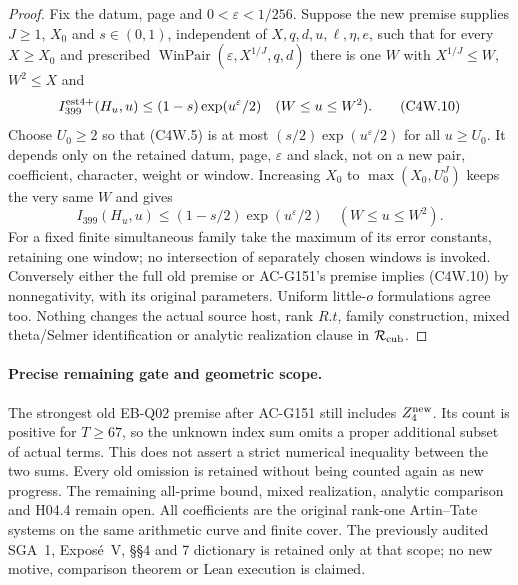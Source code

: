 \begin{proof}
Fix the datum, page and $0<\varepsilon<1/256$.
Suppose the new premise supplies $J\geq1$, $X_0$ and
$s\in(0,1)$, independent of $X,q,d,u,\ell,\eta,e$, such that
for every $X\geq X_0$ and prescribed
$\operatorname{WinPair}(\varepsilon,X^{1/J},q,d)$ there is one
$W$ with $X^{1/J}\leq W$, $W^2\leq X$ and
\[
 I_{399}^{\rm est4+}(H_u,u)\leq(1-s)\exp(u^\varepsilon/2)
                                  \quad(W\leq u\leq W^2).
 \tag{C4W.10}
\]
Choose $U_0\geq2$ so that (C4W.5) is at most
$(s/2)\exp(u^\varepsilon/2)$ for all $u\geq U_0$.
It depends only on the retained datum, page, $\varepsilon$ and
slack, not on a new pair, coefficient, character, weight or window.
Increasing $X_0$ to $\max(X_0,U_0^J)$ keeps the very same $W$
and gives
\[
 I_{399}(H_u,u)\leq(1-s/2)\exp(u^\varepsilon/2)
                                  \quad(W\leq u\leq W^2).
 \tag{C4W.11}
\]
For a fixed finite simultaneous family take the maximum of its
error constants, retaining one window; no intersection of separately
chosen windows is invoked.  Conversely either the full old premise
or AC-G151's premise implies (C4W.10) by nonnegativity, with its
original parameters.  Uniform little-$o$ formulations agree too.
Nothing changes the actual source host, rank $R.t$, family
construction, mixed theta/Selmer identification or analytic
realization clause in $\mathcal R_{\rm cub}$.
\end{proof}

\paragraph{Precise remaining gate and geometric scope.}
The strongest old EB-Q02 premise after AC-G151 still includes
$Z_4^{\rm new}$.  Its count is positive for $T\geq67$,
so the unknown index sum omits a proper additional subset of
actual terms.  This does not assert a strict numerical inequality
between the two sums.  Every old omission is retained without
being counted again as new progress.
The remaining all-prime bound, mixed realization, analytic
comparison and H04.4 remain open.  All coefficients are the
original rank-one Artin--Tate systems on the same arithmetic
curve and finite cover.  The previously audited SGA~1,
Expos\'e~V, \S\S4 and 7 dictionary is retained only at that scope;
no new motive, comparison theorem or Lean execution is claimed.
